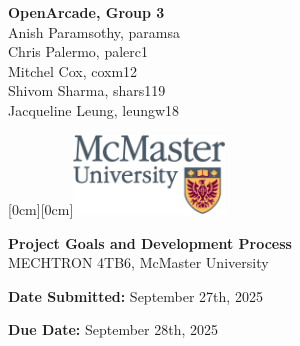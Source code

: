 \documentclass[a4]{article}
\date{\today}
\begin{document}
\begin{titlepage}

	\hspace*{0mm}\textbf{\Large OpenArcade, Group 3}\\
	\hspace*{0mm} \large Anish Paramsothy, paramsa\\
	\hspace*{0mm} \large Chris Palermo, palerc1\\
	\hspace*{0mm} \large Mitchel Cox, coxm12\\
	\hspace*{0mm} \large Shivom Sharma, shars119\\
	\hspace*{0mm} \large Jacqueline Leung, leungw18

	\hspace*{\textwidth}
	\hspace{-4cm}
	\vspace{-2cm}
	\raisebox{1cm}[0cm][0cm]{\includegraphics[width=4cm]{m24-col_png.png}}

	\vspace{7cm}


	\begin{center}
		\Huge \textbf{Project Goals and Development Process} \\[1em]
		\Large MECHTRON 4TB6, McMaster University
	\end{center}
	\vspace{7cm}

	\hspace*{0mm} \textbf{\large Date Submitted:} September 27th, 2025

	\hspace*{0mm} \textbf{\large Due Date:} September 28th, 2025
\end{titlepage}
\tableofcontents

\clearpage
\end{document}
